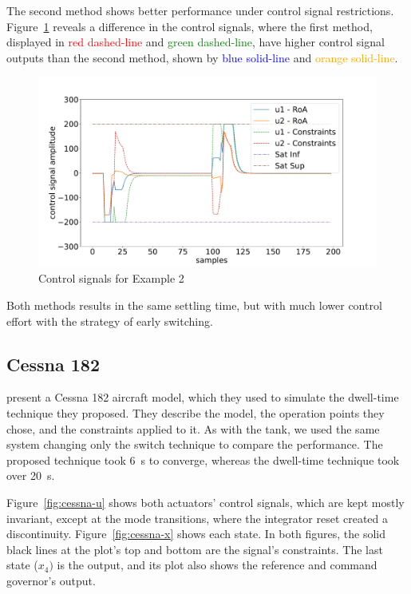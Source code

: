 The second method shows better performance under control signal restrictions.
Figure~\ref{fig:unstable-control-signals} reveals a difference in the control
signals, where the first method, displayed in \textcolor{red}{red dashed-line}
and \textcolor{green}{green dashed-line}, have higher control signal outputs
than the second method, shown by \textcolor{blue}{blue solid-line} and
\textcolor{orange}{orange solid-line}.

\begin{figure}[ht!]
	\centering
	\captionsetup{justification=centering}
	\includegraphics[width=\linewidth]{imgs/unstable_control_signal}
	\caption{Control signals for Example 2}%
	\label{fig:unstable-control-signals}
\end{figure}

Both methods results in the same settling time, but with much lower control
effort with the strategy of early switching.

\FloatBarrier

\subsection{Cessna 182}%
\label{subsec:cessna}

\textcite{franzè.lucia.ea:command} present a Cessna 182 aircraft model, which
they used to simulate the dwell-time technique they proposed. They describe the
model, the operation points they chose, and the constraints applied to it. As
with the tank, we used the same system changing only the switch technique to
compare the performance. The proposed technique took \SI{6}{\second} to
converge, whereas the dwell-time technique took over \SI{20}{\second}.

Figure~\ref{fig:cessna-u} shows both actuators' control signals, which are kept
mostly invariant, except at the mode transitions, where the integrator reset
created a discontinuity. Figure~\ref{fig:cessna-x} shows each state. In both
figures, the solid black lines at the plot's top and bottom are the signal's
constraints. The last state (\(x_4)\) is the output, and its plot also shows the
reference and command governor's output.

